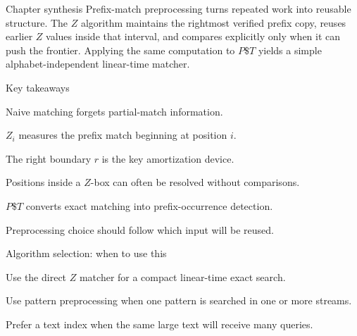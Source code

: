 \documentclass[11pt,letterpaper]{article}
\begin{document}
\begin{CornellNotesTable}
\end{CornellNotesTable}

\begin{CornellSummaryBox}{Chapter synthesis}
Prefix-match preprocessing turns repeated work into reusable structure. The $Z$ algorithm maintains the rightmost verified prefix copy, reuses earlier $Z$ values inside that interval, and compares explicitly only when it can push the frontier. Applying the same computation to $P\$T$ yields a simple alphabet-independent linear-time matcher.
\end{CornellSummaryBox}

\begin{CornellSummaryBox}{Key takeaways}
\begin{CornellRecallList}
  \item Naive matching forgets partial-match information.
  \item $Z_i$ measures the prefix match beginning at position $i$.
  \item The right boundary $r$ is the key amortization device.
  \item Positions inside a $Z$-box can often be resolved without comparisons.
  \item $P\$T$ converts exact matching into prefix-occurrence detection.
  \item Preprocessing choice should follow which input will be reused.
\end{CornellRecallList}
\end{CornellSummaryBox}

\begin{CornellOverviewBox}{Algorithm selection: when to use this}
\begin{CornellChecklist}
  \item Use the direct $Z$ matcher for a compact linear-time exact search.
  \item Use pattern preprocessing when one pattern is searched in one or more streams.
  \item Prefer a text index when the same large text will receive many queries.
\end{CornellChecklist}
\end{CornellOverviewBox}
\end{document}
